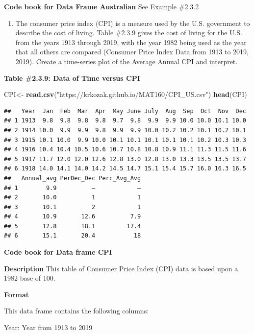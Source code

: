 \documentclass[]{book}
\newenvironment{Shaded}{\begin{snugshade}}{\end{snugshade}}
\newcommand{\KeywordTok}[1]{\textcolor[rgb]{0.13,0.29,0.53}{\textbf{#1}}}
\newcommand{\NormalTok}[1]{#1}
\newcommand{\StringTok}[1]{\textcolor[rgb]{0.31,0.60,0.02}{#1}}
\providecommand{\tightlist}{%
  \setlength{\itemsep}{0pt}\setlength{\parskip}{0pt}}
\begin{document}
\textbf{Code book for Data Frame Australian} See Example \#2.3.2

\begin{enumerate}
\def\labelenumi{\arabic{enumi}.}
\setcounter{enumi}{6}
\tightlist
\item
  The consumer price index (CPI) is a measure used by the U.S. government to describe the cost of living. Table \#2.3.9 gives the cost of living for the U.S. from the years 1913 through 2019, with the year 1982 being used as the year that all others are compared (Consumer Price Index Data from 1913 to 2019, 2019). Create a time-series plot of the Average Annual CPI and interpret.
\end{enumerate}

\textbf{Table \#2.3.9: Data of Time versus CPI}

\begin{Shaded}
\begin{Highlighting}[]
\NormalTok{CPI<-}\StringTok{ }\KeywordTok{read.csv}\NormalTok{(}\StringTok{"https://krkozak.github.io/MAT160/CPI_US.csv"}\NormalTok{)}
\KeywordTok{head}\NormalTok{(CPI)}
\end{Highlighting}
\end{Shaded}

\begin{verbatim}
##   Year  Jan  Feb  Mar  Apr  May June July  Aug  Sep  Oct  Nov  Dec
## 1 1913  9.8  9.8  9.8  9.8  9.7  9.8  9.9  9.9 10.0 10.0 10.1 10.0
## 2 1914 10.0  9.9  9.9  9.8  9.9  9.9 10.0 10.2 10.2 10.1 10.2 10.1
## 3 1915 10.1 10.0  9.9 10.0 10.1 10.1 10.1 10.1 10.1 10.2 10.3 10.3
## 4 1916 10.4 10.4 10.5 10.6 10.7 10.8 10.8 10.9 11.1 11.3 11.5 11.6
## 5 1917 11.7 12.0 12.0 12.6 12.8 13.0 12.8 13.0 13.3 13.5 13.5 13.7
## 6 1918 14.0 14.1 14.0 14.2 14.5 14.7 15.1 15.4 15.7 16.0 16.3 16.5
##   Annual_avg PerDec_Dec Perc_Avg_Avg
## 1        9.9          –            –
## 2       10.0          1            1
## 3       10.1          2            1
## 4       10.9       12.6          7.9
## 5       12.8       18.1         17.4
## 6       15.1       20.4           18
\end{verbatim}

\textbf{Code book for Data frame CPI}

\textbf{Description}
This table of Consumer Price Index (CPI) data is based upon a 1982 base of 100.

\textbf{Format}

This data frame contains the following columns:

Year: Year from 1913 to 2019
\end{document}
